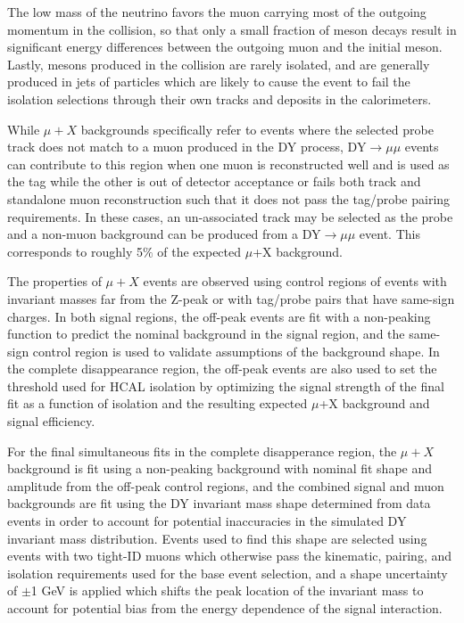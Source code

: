The low mass of the neutrino favors the muon carrying most of the outgoing momentum in the collision, so that only a small fraction of meson decays result in significant energy differences between the outgoing muon and the initial meson.
Lastly, mesons produced in the collision are rarely isolated, and are generally produced in jets of particles which are likely to cause the event to fail the isolation selections through their own tracks and deposits in the calorimeters.

While $\mu+X$ backgrounds specifically refer to events where the selected probe track does not match to a muon produced in the DY process, DY$\rightarrow\mu\mu$ events can contribute to this region when one muon is reconstructed well and is used as the tag while the other is out of detector acceptance or fails both track and standalone muon reconstruction such that it does not pass the tag/probe pairing requirements. 
In these cases, an un-associated track may be selected as the probe and a non-muon background can be produced from a DY$\rightarrow\mu\mu$ event. 
This corresponds to roughly 5$\%$ of the expected $\mu$+X background.

The properties of $\mu+X$ events are observed using control regions of events with invariant masses far from the Z-peak or with tag/probe pairs that have same-sign charges.
In both signal regions, the off-peak events are fit with a non-peaking function to predict the nominal background in the signal region, and the same-sign control region is used to validate assumptions of the background shape.
In the complete disappearance region, the off-peak events are also used to set the threshold used for HCAL isolation by optimizing the signal strength of the final fit as a function of isolation and the resulting expected $\mu$+X background and signal efficiency.

For the final simultaneous fits in the complete disapperance region, the $\mu+X$ background is fit using a non-peaking background with nominal fit shape and amplitude from the off-peak control regions, and the combined signal and muon backgrounds are fit using the DY invariant mass shape determined from data events in order to account for potential inaccuracies in the simulated DY invariant mass distribution.
Events used to find this shape are selected using events with two tight-ID muons which otherwise pass the kinematic, pairing, and isolation requirements used for the base event selection, and a shape uncertainty of $\pm$1 GeV is applied which shifts the peak location of the invariant mass to account for potential bias from the energy dependence of the signal interaction.

